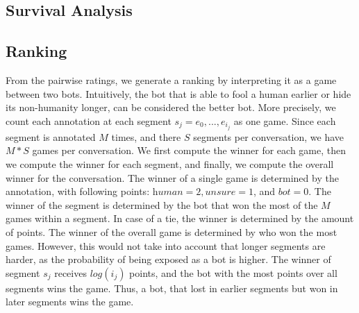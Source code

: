 \documentclass[11pt,a4paper]{article}
\begin{document}
\subsection{Survival Analysis}


\subsection{Ranking}
From the pairwise ratings, we generate a ranking by interpreting it as a game between two bots. Intuitively, the bot that is able to fool a human earlier or hide its non-humanity longer, can be considered the better bot. More precisely, we count each annotation at each segment $s_j = e_0, ... , e_{i_j}$ as one game. Since each segment is annotated $M$ times, and there $S$ segments per conversation, we have $M*S$ games per conversation. We first compute the winner for each game, then we compute the winner for each segment, and finally, we compute the overall winner for the conversation. The winner of a single game is determined by the annotation, with following points: $\textit{human}=2, \textit{unsure}=1$, and $\textit{bot}=0$. The winner of the segment is determined by the bot that won the most of the $M$ games within a segment. In case of a tie, the winner is determined by the amount of points. The winner of the overall game is determined by who won the most games. However, this would not take into account that longer segments are harder, as the probability of being exposed as a bot is higher. The winner of segment $s_j$ receives $log(i_j)$ points, and the bot with the most points over all segments wins the game. Thus, a bot, that lost in earlier segments but won in later segments wins the game.

\begin{table}[h!]
\vspace{-1mm}
\begin{center}
\begin{small}
\end{small}
\\~\\
  \vspace{1mm}
\end{center}
\caption{Win Rates for Empathetic Dialogues.}
\label{table:domain-overview}
\end{table}
\end{document}
